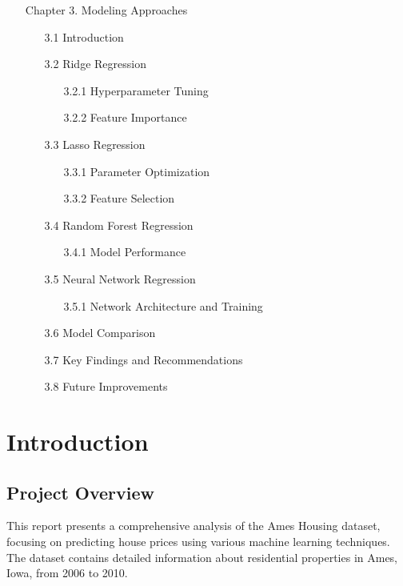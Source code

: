 \documentclass[12pt]{report}
\begin{document}
\begin{itemize}
\item[Chapter 3.] Modeling Approaches
    \begin{itemize}
    \item[3.1] Introduction
    \item[3.2] Ridge Regression
        \begin{itemize}
        \item[3.2.1] Hyperparameter Tuning
        \item[3.2.2] Feature Importance
        \end{itemize}
    \item[3.3] Lasso Regression
        \begin{itemize}
        \item[3.3.1] Parameter Optimization
        \item[3.3.2] Feature Selection
        \end{itemize}
    \item[3.4] Random Forest Regression
        \begin{itemize}
        \item[3.4.1] Model Performance
        \end{itemize}
    \item[3.5] Neural Network Regression
        \begin{itemize}
        \item[3.5.1] Network Architecture and Training
        \end{itemize}
    \item[3.6] Model Comparison
    \item[3.7] Key Findings and Recommendations
    \item[3.8] Future Improvements
    \end{itemize}
\end{itemize}

\chapter{Introduction}

\section{Project Overview}
This report presents a comprehensive analysis of the Ames Housing dataset, focusing on predicting house prices using various machine learning techniques. The dataset contains detailed information about residential properties in Ames, Iowa, from 2006 to 2010.
\end{document}
